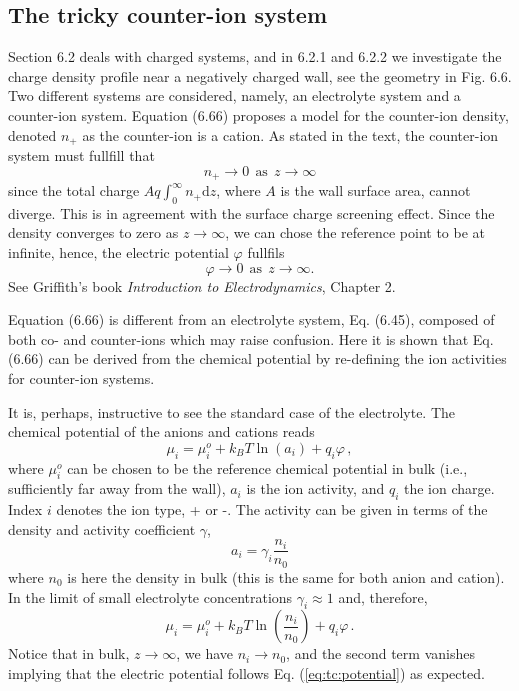 \documentclass[11pt]{article}
\renewcommand{\d}{\mathrm{d}}
\begin{document}
\subsection*{The tricky counter-ion system}
Section 6.2 deals with charged systems, and in 6.2.1 and 6.2.2 we investigate the 
charge density profile near a negatively charged wall, see the geometry in Fig. 6.6. 
Two different systems are considered, namely, an electrolyte system and a counter-ion system. 
Equation (6.66) proposes a model for the counter-ion density, denoted $n_+$ as the counter-ion is 
a cation. As stated in the text, the counter-ion system must fullfill that
\begin{equation}
\label{eq:tc:n+zero}	
	n_+ \rightarrow 0 \ \ \text{as} \ \ z \rightarrow \infty
\end{equation}
since the total charge $A q\int_0^\infty n_+ \d z$, where $A$ is the wall surface area, cannot 
diverge. This is in agreement with the surface charge screening effect. Since
the density converges to zero as $z \rightarrow \infty$, we can chose the
reference point to be at infinite, hence, the electric potential $\varphi$ fullfils  
\begin{equation}
\label{eq:tc:potential}
 \varphi \rightarrow 0 \ \ \text{as} \ \ z \rightarrow \infty.
\end{equation}
See Griffith's book \emph{Introduction to Electrodynamics}, Chapter 2.   

Equation (6.66) is different from an electrolyte system, Eq. (6.45), composed of both co- and 
counter-ions which may raise confusion. Here it is shown that Eq. (6.66) can be derived from the 
chemical potential by re-defining the ion activities for counter-ion systems.

It is, perhaps, instructive to see the standard case of the electrolyte. The chemical potential of 
the anions and cations reads
\begin{equation}
	\mu_i = \mu_i^o + k_BT\ln(a_i) + q_i\varphi \, ,
\end{equation}
where $\mu_i^o$ can be chosen to be the reference chemical potential in bulk (i.e., sufficiently 
far away from the wall), $a_i$ is the ion activity, and $q_i$ the ion         
charge. Index $i$ denotes the ion type, + or -. The activity can be given in terms of the 
density and activity coefficient $\gamma$, 
\begin{equation}
\label{eq:tc:activity0}
a_i = \gamma_i \frac{n_i}{n_0} 
\end{equation}
where $n_0$ is here the density in bulk (this is the same for both anion and cation). In the limit 
of small electrolyte concentrations $\gamma_i \approx 1$ and, therefore,
\begin{equation}
	\mu_i = \mu_i^o + k_BT\ln\left(\frac{n_i}{n_0}\right) + q_i\varphi \, .
\end{equation}
Notice that in bulk, $z \rightarrow \infty$, we have $n_i \rightarrow n_0$, and the second term 
vanishes implying that the electric potential follows Eq. (\ref{eq:tc:potential}) as expected. 
\end{document}
